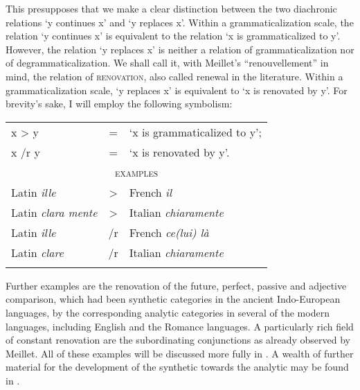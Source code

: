 This presupposes that we make a clear distinction between the two diachronic relations ‘y continues x’ and ‘y replaces x’. Within a grammaticalization scale, the relation ‘y continues x’ is equivalent to the relation ‘x is grammaticalized to y’. However, the relation ‘y replaces x’ is neither a relation of grammaticalization nor of degrammaticalization. We shall call it, with Meillet's ``renouvellement'' in mind, the relation of \textsc{renovation}, also called renewal in the literature. Within a grammaticalization scale, ‘y replaces x’ is equivalent to ‘x is renovated by y’. For brevity's sake, I will employ the following symbolism:

%	
%	
%	
%	
%
%	
	

	\begin{longtable}{lcl}
		\lsptoprule
		x {\textgreater} y & = & ‘x is grammaticalized to y’;\\
		x /r y & = & ‘x is renovated by y’.\\
		\midrule
		\multicolumn{3}{c}{\textsc{examples}}\\
		Latin \textit{ille} &       {\textgreater} &  French \textit{il}\\
		Latin \textit{clara mente} & {\textgreater} &  Italian \textit{chiaramente}\\
		Latin \textit{ille}    &    /r & French \textit{ce(lui) là}\\
		Latin \textit{clare}   &   /r & Italian \textit{chiaramente}\\
		\lspbottomrule
	\end{longtable}

Further examples are the renovation of the future, perfect, passive and adjective comparison, which had been synthetic categories in the ancient Indo-European languages, by the corresponding analytic categories in several of the modern languages, including English and the Romance languages. A particularly rich field of constant renovation are the subordinating conjunctions as already observed by Meillet. All of these examples will be discussed more fully in . A wealth of further material for the development of the synthetic towards the analytic may be found in \citet[Ch.~I]{Tauli1966}.

